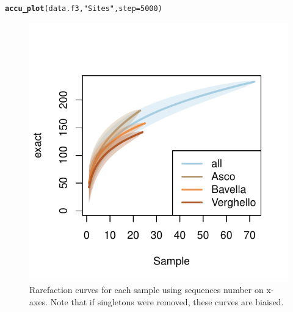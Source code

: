 \documentclass[12pt]{article}\usepackage[]{graphicx}\usepackage[]{color}
\makeatletter
\def\maxwidth{ %
  \ifdim\Gin@nat@width>\linewidth
    \linewidth
  \else
    \Gin@nat@width
  \fi
}
\newcommand{\hlnum}[1]{\textcolor[rgb]{0.686,0.059,0.569}{#1}}%
\newcommand{\hlstr}[1]{\textcolor[rgb]{0.192,0.494,0.8}{#1}}%
\newcommand{\hlstd}[1]{\textcolor[rgb]{0.345,0.345,0.345}{#1}}%
\newcommand{\hlkwc}[1]{\textcolor[rgb]{0.333,0.667,0.333}{#1}}%
\newcommand{\hlkwd}[1]{\textcolor[rgb]{0.737,0.353,0.396}{\textbf{#1}}}%
\newenvironment{kframe}{%
 \def\at@end@of@kframe{}%
 \ifinner\ifhmode%
  \def\at@end@of@kframe{\end{minipage}}%
  \begin{minipage}{\columnwidth}%
 \fi\fi%
 \def\FrameCommand##1{\hskip\@totalleftmargin \hskip-\fboxsep
 \colorbox{shadecolor}{##1}\hskip-\fboxsep
     \hskip-\linewidth \hskip-\@totalleftmargin \hskip\columnwidth}%
 \MakeFramed {\advance\hsize-\width
   \@totalleftmargin\z@ \linewidth\hsize
   \@setminipage}}%
 {\par\unskip\endMakeFramed%
 \at@end@of@kframe}
\newenvironment{knitrout}{}{} %
\numberwithin{figure}{section}
\makeatother
\begin{document}
\begin{knitrout}\small
{}\color{fgcolor}\begin{kframe}
\begin{alltt}
\hlkwd{accu_plot}\hlstd{(data.f3,} \hlstr{"Sites"}\hlstd{,} \hlkwc{step} \hlstd{=} \hlnum{5000}\hlstd{)}
\end{alltt}
\end{kframe}\begin{figure}

{\centering \includegraphics[width=\maxwidth]{figure/unnamed-chunk-35-1} 

}

\caption[Rarefaction curves for each sample using sequences number on x-axes]{Rarefaction curves for each sample using sequences number on x-axes. Note that if singletons were removed, these curves are biaised.}\label{fig:unnamed-chunk-35}
\end{figure}


\end{knitrout}
\end{document}
